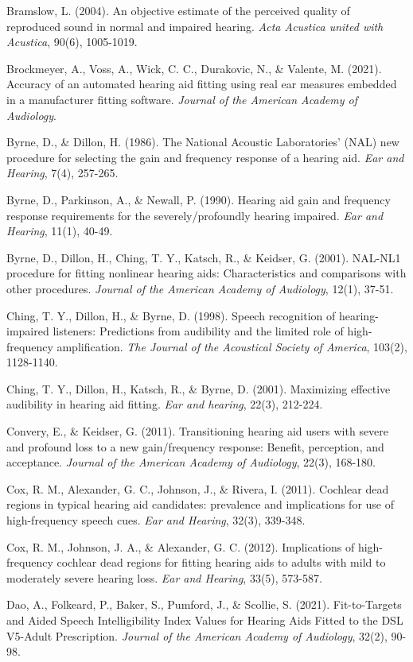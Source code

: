 \documentclass[
  12pt,
]{article}
\begin{document}
Bramslow, L. (2004). An objective estimate of the perceived quality of
reproduced sound in normal and impaired hearing. \emph{Acta Acustica
united with Acustica}, 90(6), 1005-1019.

Brockmeyer, A., Voss, A., Wick, C. C., Durakovic, N., \& Valente, M.
(2021). Accuracy of an automated hearing aid fitting using real ear
measures embedded in a manufacturer fitting software. \emph{Journal of
the American Academy of Audiology}.

Byrne, D., \& Dillon, H. (1986). The National Acoustic Laboratories'
(NAL) new procedure for selecting the gain and frequency response of a
hearing aid. \emph{Ear and Hearing}, 7(4), 257-265.

Byrne, D., Parkinson, A., \& Newall, P. (1990). Hearing aid gain and
frequency response requirements for the severely/profoundly hearing
impaired. \emph{Ear and Hearing}, 11(1), 40-49.

Byrne, D., Dillon, H., Ching, T. Y., Katsch, R., \& Keidser, G. (2001).
NAL-NL1 procedure for fitting nonlinear hearing aids: Characteristics
and comparisons with other procedures. \emph{Journal of the American
Academy of Audiology}, 12(1), 37-51.

Ching, T. Y., Dillon, H., \& Byrne, D. (1998). Speech recognition of
hearing-impaired listeners: Predictions from audibility and the limited
role of high-frequency amplification. \emph{The Journal of the
Acoustical Society of America}, 103(2), 1128-1140.

Ching, T. Y., Dillon, H., Katsch, R., \& Byrne, D. (2001). Maximizing
effective audibility in hearing aid fitting. \emph{Ear and hearing},
22(3), 212-224.

Convery, E., \& Keidser, G. (2011). Transitioning hearing aid users with
severe and profound loss to a new gain/frequency response: Benefit,
perception, and acceptance. \emph{Journal of the American Academy of
Audiology}, 22(3), 168-180.

Cox, R. M., Alexander, G. C., Johnson, J., \& Rivera, I. (2011).
Cochlear dead regions in typical hearing aid candidates: prevalence and
implications for use of high-frequency speech cues. \emph{Ear and
Hearing}, 32(3), 339-348.

Cox, R. M., Johnson, J. A., \& Alexander, G. C. (2012). Implications of
high-frequency cochlear dead regions for fitting hearing aids to adults
with mild to moderately severe hearing loss. \emph{Ear and Hearing},
33(5), 573-587.

Dao, A., Folkeard, P., Baker, S., Pumford, J., \& Scollie, S. (2021).
Fit-to-Targets and Aided Speech Intelligibility Index Values for Hearing
Aids Fitted to the DSL V5-Adult Prescription. \emph{Journal of the
American Academy of Audiology}, 32(2), 90-98.
\end{document}
